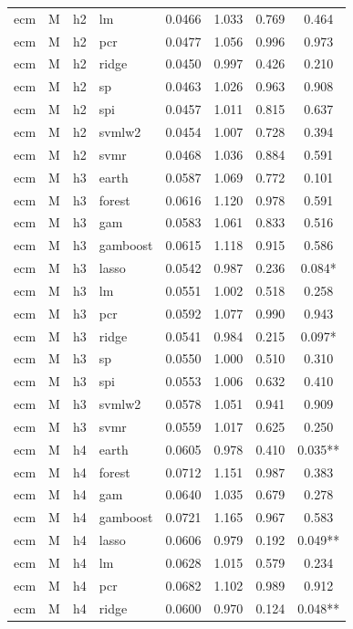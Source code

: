 \begin{ThreePartTable}
\begin{longtable}[t]{llclcccc}
ecm & M & h2 & lm & 0.0466 & 1.033 & 0.769 & 0.464\\
ecm & M & h2 & pcr & 0.0477 & 1.056 & 0.996 & 0.973\\
ecm & M & h2 & ridge & 0.0450 & 0.997 & 0.426 & 0.210\\
ecm & M & h2 & sp & 0.0463 & 1.026 & 0.963 & 0.908\\
ecm & M & h2 & spi & 0.0457 & 1.011 & 0.815 & 0.637\\
ecm & M & h2 & svmlw2 & 0.0454 & 1.007 & 0.728 & 0.394\\
ecm & M & h2 & svmr & 0.0468 & 1.036 & 0.884 & 0.591\\
\addlinespace
ecm & M & h3 & earth & 0.0587 & 1.069 & 0.772 & 0.101\\
ecm & M & h3 & forest & 0.0616 & 1.120 & 0.978 & 0.591\\
ecm & M & h3 & gam & 0.0583 & 1.061 & 0.833 & 0.516\\
ecm & M & h3 & gamboost & 0.0615 & 1.118 & 0.915 & 0.586\\
ecm & M & h3 & lasso & 0.0542 & 0.987 & 0.236 & 0.084*\\
ecm & M & h3 & lm & 0.0551 & 1.002 & 0.518 & 0.258\\
ecm & M & h3 & pcr & 0.0592 & 1.077 & 0.990 & 0.943\\
ecm & M & h3 & ridge & 0.0541 & 0.984 & 0.215 & 0.097*\\
ecm & M & h3 & sp & 0.0550 & 1.000 & 0.510 & 0.310\\
ecm & M & h3 & spi & 0.0553 & 1.006 & 0.632 & 0.410\\
ecm & M & h3 & svmlw2 & 0.0578 & 1.051 & 0.941 & 0.909\\
ecm & M & h3 & svmr & 0.0559 & 1.017 & 0.625 & 0.250\\
\addlinespace
ecm & M & h4 & earth & 0.0605 & 0.978 & 0.410 & 0.035**\\
ecm & M & h4 & forest & 0.0712 & 1.151 & 0.987 & 0.383\\
ecm & M & h4 & gam & 0.0640 & 1.035 & 0.679 & 0.278\\
ecm & M & h4 & gamboost & 0.0721 & 1.165 & 0.967 & 0.583\\
ecm & M & h4 & lasso & 0.0606 & 0.979 & 0.192 & 0.049**\\
ecm & M & h4 & lm & 0.0628 & 1.015 & 0.579 & 0.234\\
ecm & M & h4 & pcr & 0.0682 & 1.102 & 0.989 & 0.912\\
ecm & M & h4 & ridge & 0.0600 & 0.970 & 0.124 & 0.048**\\

\end{longtable}
\end{ThreePartTable}
